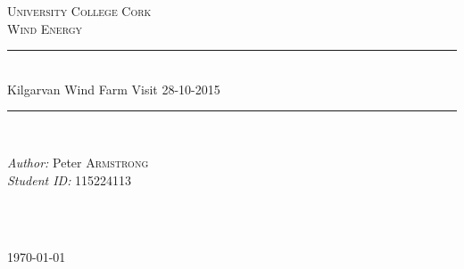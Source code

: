\documentclass[12pt]{article} %
\begin{document}

\begin{titlepage}
  \newcommand{\HRule}{\rule{\linewidth}{0.5mm}} %

  \center %

  \textsc{\LARGE University College Cork}\\[1.5cm] %
  \textsc{\Large Wind Energy}\\[0.5cm] %

  \HRule \\[0.4cm]
  { \huge Kilgarvan Wind Farm Visit 28-10-2015}\\[0.5cm] %
  \HRule \\[1.5cm]

  \begin{minipage}{0.4\textwidth}
  \begin{flushleft} \large
  \emph{Author:} Peter \textsc{Armstrong} \\%
  \emph{Student ID:} 115224113
  \end{flushleft}
  \end{minipage}
  ~
  \begin{minipage}{0.4\textwidth}
  \begin{flushright} \large
  \end{flushright}
  \end{minipage}\\[4cm]

  {\large \today}\\[3cm] %

  \vfill %

\newlength{\wideitemsep}
\setlength{\wideitemsep}{.5\itemsep}
\addtolength{\wideitemsep}{-7pt}
\let\olditem\item
\renewcommand{\item}{\setlength{\itemsep}{\wideitemsep}\olditem}

\end{titlepage}
\end{document}
